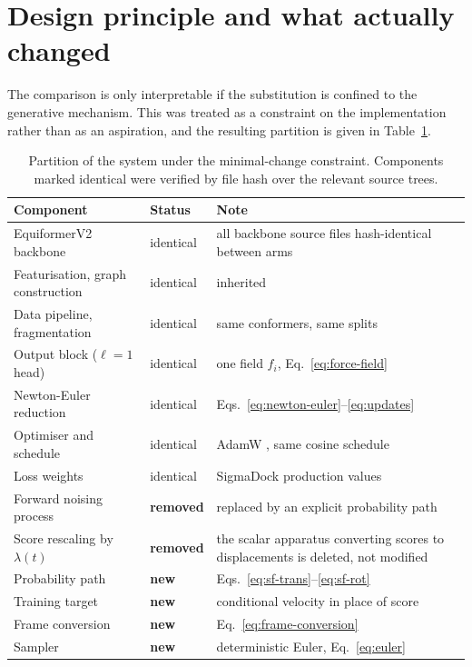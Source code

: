 \documentclass[11pt,a4paper]{report}
\theoremstyle{plain}
\theoremstyle{definition}
\theoremstyle{remark}
\begin{document}
\section{Design principle and what actually changed}
\label{sec:minimal-change}

The comparison is only interpretable if the substitution is confined to the
generative mechanism. This was treated as a constraint on the implementation
rather than as an aspiration, and the resulting partition is given in
Table~\ref{tab:minimal-change}.

\begin{table}[htbp]
\centering
\caption{Partition of the system under the minimal-change constraint.
Components marked identical were verified by file hash over the relevant
source trees.}
\label{tab:minimal-change}
\small
\begin{tabular}{@{}p{} p{} p{}@{}}
\toprule
\textbf{Component} & \textbf{Status} & \textbf{Note} \\
\midrule
EquiformerV2 backbone            & identical & all backbone source files hash-identical between arms \\
Featurisation, graph construction & identical & inherited \\
Data pipeline, fragmentation      & identical & same conformers, same splits \\
Output block ($\ell=1$ head)      & identical & one field $f_i$, Eq.~\eqref{eq:force-field} \\
Newton-Euler reduction            & identical & Eqs.~\eqref{eq:newton-euler}--\eqref{eq:updates} \\
Optimiser and schedule            & identical & AdamW \citep{loshchilov2019adamw}, same cosine schedule \\
Loss weights                      & identical & SigmaDock production values \\
\midrule
Forward noising process           & \textbf{removed} & replaced by an explicit probability path \\
Score rescaling by $\lambda(t)$   & \textbf{removed} & the scalar apparatus converting scores to displacements is deleted, not modified \\
Probability path                  & \textbf{new} & Eqs.~\eqref{eq:sf-trans}--\eqref{eq:sf-rot} \\
Training target                   & \textbf{new} & conditional velocity in place of score \\
Frame conversion                  & \textbf{new} & Eq.~\eqref{eq:frame-conversion} \\
Sampler                           & \textbf{new} & deterministic Euler, Eq.~\eqref{eq:euler} \\
\bottomrule
\end{tabular}
\end{table}
\end{document}

